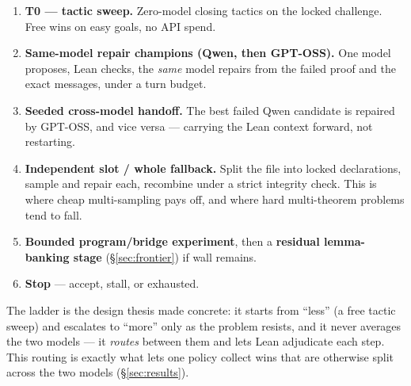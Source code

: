 \begin{enumerate}
  \item \textbf{T0 --- tactic sweep.} Zero-model closing tactics on the locked
        challenge. Free wins on easy goals, no API spend.
  \item \textbf{Same-model repair champions (Qwen, then GPT-OSS).} One model
        proposes, Lean checks, the \emph{same} model repairs from the failed
        proof and the exact messages, under a turn budget.
  \item \textbf{Seeded cross-model handoff.} The best failed Qwen candidate is
        repaired by GPT-OSS, and vice versa --- carrying the Lean context
        forward, not restarting.
  \item \textbf{Independent slot / whole fallback.} Split the file into locked
        declarations, sample and repair each, recombine under a strict integrity
        check. This is where cheap multi-sampling pays off, and where hard
        multi-theorem problems tend to fall.
  \item \textbf{Bounded program/bridge experiment}, then a \textbf{residual
        lemma-banking stage} (\S\ref{sec:frontier}) if wall remains.
  \item \textbf{Stop} --- accept, stall, or exhausted.
\end{enumerate}

The ladder is the design thesis made concrete: it starts from ``less'' (a free
tactic sweep) and escalates to ``more'' only as the problem resists, and it never
averages the two models --- it \emph{routes} between them and lets Lean
adjudicate each step. This routing is exactly what lets one policy collect wins
that are otherwise split across the two models (\S\ref{sec:results}).

